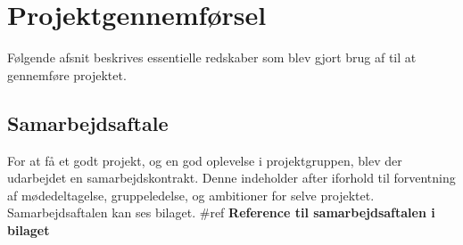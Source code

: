 
\chapter{Projektgennemførsel}

Følgende afsnit beskrives essentielle redskaber som blev gjort brug af til at gennemføre projektet. 



\section{Samarbejdsaftale}
For at få et godt projekt, og en god oplevelse i projektgruppen, blev der udarbejdet en samarbejdskontrakt. Denne indeholder after iforhold til forventning af mødedeltagelse, gruppeledelse, og ambitioner for selve projektet. Samarbejdsaftalen kan ses bilaget. \#ref \textbf{Reference til samarbejdsaftalen i bilaget}


